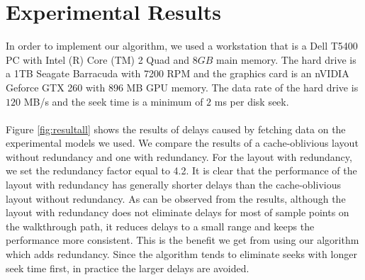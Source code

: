 \documentclass[conference]{acmsiggraph}
\begin{document}
\section{Experimental Results}

In order to implement our algorithm, we used a workstation that is a Dell T5400 PC with Intel (R) Core (TM) 2 Quad and $8GB$ main memory. The hard drive is a 1TB Seagate Barracuda with 7200 RPM and the graphics card is an nVIDIA Geforce GTX 260 with 896 MB GPU memory. The data rate of the hard drive is $120$ MB/s and the seek time is a minimum of $2$ ms per disk seek.\\
\\
Figure \ref{fig:resultall} shows the results of delays caused by fetching data on the experimental models we used. We compare the results of a cache-oblivious layout without redundancy and one with redundancy. For the layout with redundancy, we set the redundancy factor equal to 4.2. It is clear that the performance of the layout with redundancy has generally shorter delays than the cache-oblivious layout without redundancy. As can be observed from the results, although the layout with redundancy does not eliminate delays for most of sample points on the walkthrough path, it reduces delays to a small range and keeps the performance more consistent. This is the benefit we get from using our algorithm which adds redundancy. Since the algorithm tends to eliminate seeks with longer seek time first, in practice the larger delays are avoided.\\
\\
\end{document}
